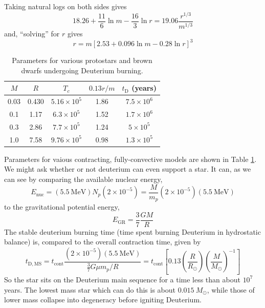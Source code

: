 \documentclass[10pt]{article}
\numberwithin{equation}{section}
\newcommand{\n}{\noindent}
\begin{document}
  Taking natural logs on both sides gives
  \begin{equation}
    \label{eq:393}
    18.26 +\frac{11}{6}\ln m-\frac{16}{3}\ln r=19.06\frac{r^{1/3}}{m^{1/3}}
  \end{equation}
  and, ``solving'' for $r$ gives
  \begin{equation}
    \label{eq:394}
    r=m\left[2.53+0.096\ln m-0.28 \ln r\right]^3
  \end{equation}
  \begin{table}[htb]
    \centering
    \begin{tabular}{ccccc}
      $M$ & $R$ & $T_c$ & $0.13 r/m$ & $t_\mathrm{D}$ (years)\\
      \hline \hline
      0.03 & 0.430 & $5.16\times 10^{5}$ & 1.86 & $7.5\times 10^6$\\
      0.1 & 1.17 & $6.3\times 10^5$ & 1.52 & $1.7\times 10^6$\\
      0.3 & 2.86 & $7.7\times 10^5$ & 1.24 & $5\times 10^5$\\
      1.0 & 7.58 & $9.76\times 10^5$ & 0.98 & $1.3\times 10^5$
    \end{tabular}
    \caption{Parameters for various protostars and brown dwarfs undergoing Deuterium burning.}
    \label{tab:deuterium}
  \end{table}
	
  \n Parameters for vaious contracting, fully-convective models are shown
  in Table \ref{tab:deuterium}.\\

  \n We might ask whether or not deuterium can even support a star. It
  can, as we can see by comparing the available nuclear energy,
  \begin{equation}
    \label{eq:395}
    E_{\mathrm{nuc}}=(5.5\ \mathrm{MeV})N_p(2\times
    10^{-5})=\frac{M}{m_p}\left(2\times 10^{-5}\right)\left(5.5\ \mathrm{MeV}\right)
  \end{equation}
  to the gravitational potential energy,
  \begin{equation}
    \label{eq:396}
    E_{\mathrm{GR}}=\frac{3}{7}\frac{GM}{R}
  \end{equation}
  The stable deuterium burning time (time spent burning Deuterium in
  hydrostatic balance) is, compared to the overall contraction time,
  given by
  \begin{equation}
    \label{eq:397}
    t_{\mathrm{D, MS}}=t_{\mathrm{cont}}\frac{(2\times 10^{-5})(5.5\
      \mathrm{MeV})}{\frac{3}{7}G\mu m_p/R}=t_{\mathrm{cont}}\left[0.13\left(\frac{R}{R_\odot}\right)\left(\frac{M}{M_\odot}\right)^{-1}\right]
  \end{equation}
  So the star sits on the Deuterium main sequence for a time less than
  about $10^7$ years. The lowest mass star which can do this is about
  $0.015\ M_\odot$, while those of lower mass collapse into degeneracy before
  igniting Deuterium.\\
\end{document}
